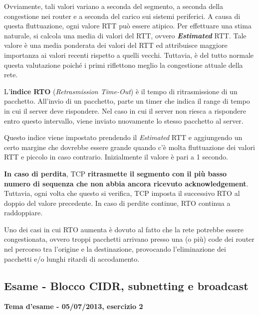 \documentclass[a4paper]{article}
\begin{document}
	\noindent
	Ovviamente, tali valori variano a seconda del segmento, a seconda della congestione nei router e a seconda del carico sui sistemi periferici. A causa di questa fluttuazione, ogni valore RTT può essere atipico. Per effettuare una stima naturale, si calcola una media di valori del RTT, ovvero \emph{\textbf{Estimated}} RTT. Tale valore è una media ponderata dei valori del RTT ed attribuisce maggiore importanza ai valori recenti rispetto a quelli vecchi. Tuttavia, è del tutto normale questa valutazione poiché i primi riflettono meglio la congestione attuale della rete.\newline
	
	\noindent
	L'\textcolor{Red3}{\textbf{indice RTO}} (\emph{Retrasmission Time-Out}) è il tempo di ritrasmissione di un pacchetto. All’invio di un pacchetto, parte un timer che indica il range di tempo in cui il server deve rispondere. Nel caso in cui il server non riesca a rispondere entro questo intervallo, viene inviato nuovamente lo stesso pacchetto al server.\newline
	
	\noindent
	Questo indice viene impostato prendendo il \emph{Estimated} RTT e aggiungendo un certo margine che dovrebbe essere grande quando c’è molta fluttuazione dei valori RTT e piccolo in caso contrario. Inizialmente il valore è pari a 1 secondo.\newline
	
	\noindent
	\textbf{In caso di perdita}, TCP \textbf{ritrasmette il segmento con il più basso numero di sequenza che non abbia ancora ricevuto acknowledgement}. Tuttavia, ogni volta che questo si verifica, TCP imposta il successivo RTO al doppio del valore precedente. In caso di perdite continue, RTO continua a raddoppiare.\newline
	
	\noindent
	Uno dei casi in cui RTO aumenta è dovuto al fatto che la rete potrebbe essere congestionata, ovvero troppi pacchetti arrivano presso una (o più) code dei router nel percorso tra l’origine e la destinazione, provocando l’eliminazione dei pacchetti e/o lunghi ritardi di accodamento.
	
	\newpage
	
	\subsection{\textcolor{Red3}{Esame - Blocco CIDR, subnetting e broadcast}}
	
	\begin{center}
		\large
		\textcolor{Green4}{\textbf{Tema d'esame - 05/07/2013, esercizio 2}}
	\end{center}
	
\end{document}
